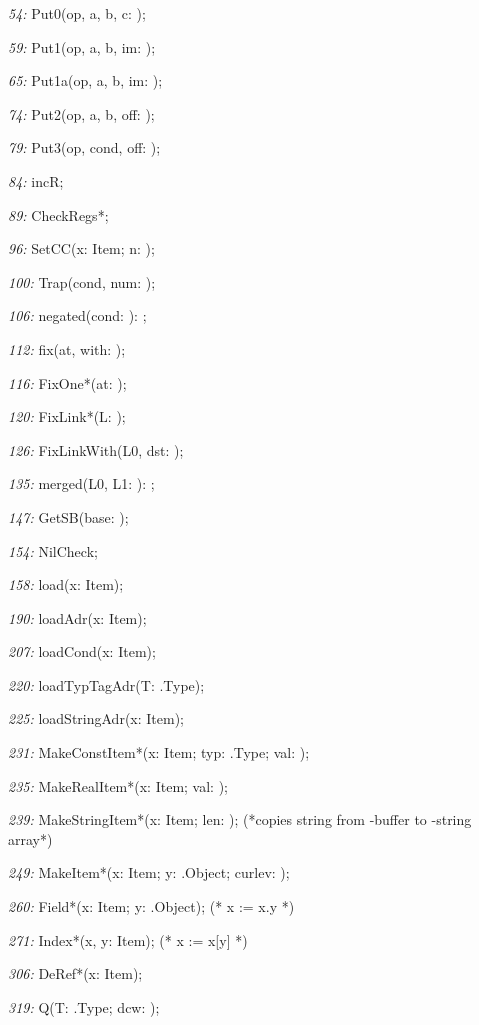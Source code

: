 \item{\it 54:} Put0(op, a, b, c: \LONGINT);
\item{\it 59:} Put1(op, a, b, im: \LONGINT);
\item{\it 65:} Put1a(op, a, b, im: \LONGINT);
\item{\it 74:} Put2(op, a, b, off: \LONGINT);
\item{\it 79:} Put3(op, cond, off: \LONGINT);
\item{\it 84:} incR;
\item{\it 89:} CheckRegs*;
\item{\it 96:} SetCC(\VAR x: Item; n: \LONGINT);
\item{\it 100:} Trap(cond, num: \LONGINT);
\item{\it 106:} negated(cond: \LONGINT): \LONGINT;
\item{\it 112:} fix(at, with: \LONGINT);
\item{\it 116:} FixOne*(at: \LONGINT);
\item{\it 120:} FixLink*(L: \LONGINT);
\item{\it 126:} FixLinkWith(L0, dst: \LONGINT);
\item{\it 135:} merged(L0, L1: \LONGINT): \LONGINT;
\item{\it 147:} GetSB(base: \LONGINT);
\item{\it 154:} NilCheck;
\item{\it 158:} load(\VAR x: Item);
\item{\it 190:} loadAdr(\VAR x: Item);
\item{\it 207:} loadCond(\VAR x: Item);
\item{\it 220:} loadTypTagAdr(T: \ORB.Type);
\item{\it 225:} loadStringAdr(\VAR x: Item);
\item{\it 231:} MakeConstItem*(\VAR x: Item; typ: \ORB.Type; val: \LONGINT);
\item{\it 235:} MakeRealItem*(\VAR x: Item; val: \REAL);
\item{\it 239:} MakeStringItem*(\VAR x: Item; len: \LONGINT); (*copies string from \ORS-buffer to \ORG-string array*)
\item{\it 249:} MakeItem*(\VAR x: Item; y: \ORB.Object; curlev: \LONGINT);
\item{\it 260:} Field*(\VAR x: Item; y: \ORB.Object);   (* x := x.y *)
\item{\it 271:} Index*(\VAR x, y: Item);   (* x := x[y] *)
\item{\it 306:} DeRef*(\VAR x: Item);
\item{\it 319:} Q(T: \ORB.Type; \VAR dcw: \LONGINT);
